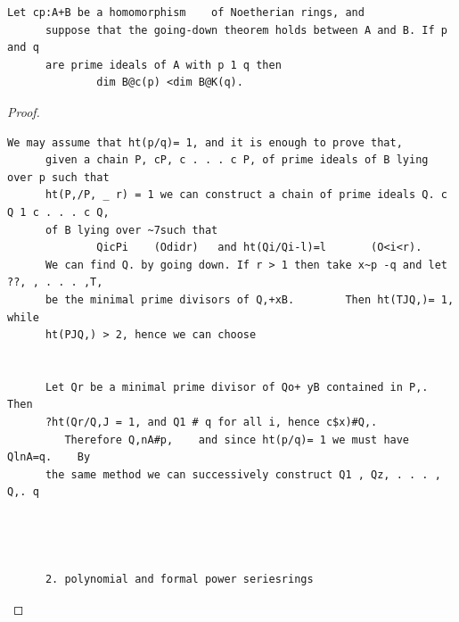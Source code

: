 \begin{theorem}\label{mcrt-auto-theorem-15-3}\uses{}
\begin{verbatim}
Let cp:A+B be a homomorphism    of Noetherian rings, and
      suppose that the going-down theorem holds between A and B. If p and q
      are prime ideals of A with p 1 q then
              dim B@c(p) <dim B@K(q).
\end{verbatim}
\end{theorem}
\begin{proof}
\begin{verbatim}
We may assume that ht(p/q)= 1, and it is enough to prove that,
      given a chain P, cP, c . . . c P, of prime ideals of B lying over p such that
      ht(P,/P, _ r) = 1 we can construct a chain of prime ideals Q. c Q 1 c . . . c Q,
      of B lying over ~7such that
              QicPi    (Odidr)   and ht(Qi/Qi-l)=l       (O<i<r).
      We can find Q. by going down. If r > 1 then take x~p -q and let ??, , . . . ,T,
      be the minimal prime divisors of Q,+xB.        Then ht(TJQ,)= 1, while
      ht(PJQ,) > 2, hence we can choose


      Let Qr be a minimal prime divisor of Qo+ yB contained in P,. Then
      ?ht(Qr/Q,J = 1, and Q1 # q for all i, hence c$x)#Q,.
         Therefore Q,nA#p,    and since ht(p/q)= 1 we must have QlnA=q.    By
      the same method we can successively construct Q1 , Qz, . . . , Q,. q




      2. polynomial and formal power seriesrings
\end{verbatim}
\end{proof}


